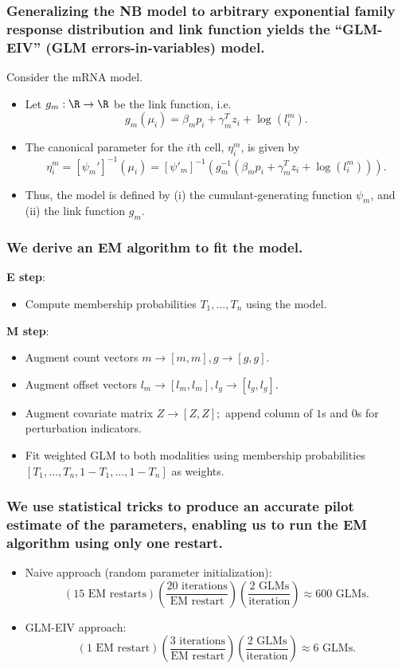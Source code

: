 \documentclass{beamer}
\begin{document}
\begin{frame}
\frametitle{Generalizing the NB model to arbitrary exponential family response distribution and link function yields the ``GLM-EIV'' (GLM errors-in-variables) model.}

Consider the mRNA model.
\begin{itemize}
\item Let $g_m : \R \to \R$ be the link function, i.e.
$$g_m(\mu_i) = \beta_m p_i + \gamma^T_m z_i + \log(l_i^m).$$
\item The canonical parameter for the $i$th cell, $\eta^m_i$, is given by
$$ \eta_i^m = \left[ \psi_m' \right]^{-1} \left( \mu_i \right) = \left[ \psi'_m \right]^{-1} \left( g_m^{-1} \left( \beta_m p_i + \gamma_m^T z_i + \log(l_i^m) \right)\right).$$
\item Thus, the model is defined by (i) the cumulant-generating function $\psi_m$, and (ii) the link function $g_m$. 
\end{itemize}
\end{frame}

\begin{frame}
\frametitle{We derive an EM algorithm to fit the model.}
\textbf{E step}:
\begin{itemize}
\item Compute membership probabilities $T_1, \dots, T_n$ using the model.
\end{itemize}

\textbf{M step}:
\begin{itemize}
\item Augment count vectors $m \rightarrow [m, m], g \rightarrow [g, g]$.
\item Augment offset vectors $l_m \rightarrow [l_m, l_m], l_g \rightarrow [l_g, l_g]$.
\item Augment covariate matrix  $Z \rightarrow [Z, Z];$ append column of $1$s and $0$s for perturbation indicators.
\item Fit weighted GLM to both modalities using membership probabilities $[T_1, \dots, T_n, 1 - T_1, \dots, 1 - T_n]$ as weights.
\end{itemize}
\end{frame}


\begin{frame}
\frametitle{We use statistical tricks to produce an accurate pilot estimate of the parameters, enabling us to run the EM algorithm using only one restart.}
\begin{itemize}
	\item Naive approach (random parameter initialization): $$\left( \textrm{15 EM restarts} \right) \left( \frac{ \textrm{20 iterations} }{\textrm{EM restart}} \right) \left( \frac{\textrm{2 GLMs}}{\textrm{iteration}}\right) \approx \textrm{600 GLMs}.$$
	\item GLM-EIV approach: 
	$$ \left(\textrm{1 EM restart}\right) \left( \frac{ \textrm{3 iterations}}{\textrm{EM restart}} \right)\left( \frac{ \textrm{2 GLMs} }{ \textrm{iteration} } \right) \approx \textrm{6 GLMs}.$$
\end{itemize}
\end{frame}
\end{document}

